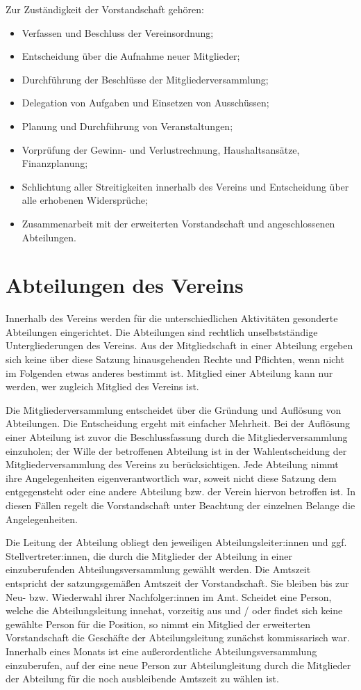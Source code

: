 \documentclass[10pt,a4paper]{article}
\begin{document}
Zur Zuständigkeit der Vorstandschaft gehören:
\begin{itemize}
\item
Verfassen und Beschluss der Vereinsordnung;
\item
Entscheidung über die Aufnahme neuer Mitglieder;
\item
Durchführung der Beschlüsse der Mitgliederversammlung;
\item
Delegation von Aufgaben und Einsetzen von Ausschüssen;
\item
Planung und Durchführung von Veranstaltungen;
\item
Vorprüfung der Gewinn- und Verlustrechnung, Haushaltsansätze, Finanzplanung;
\item
Schlichtung aller Streitigkeiten innerhalb des Vereins und Entscheidung über alle erhobenen
Widersprüche;
\item
Zusammenarbeit mit der erweiterten Vorstandschaft und angeschlossenen Abteilungen.
\end{itemize}
\section{Abteilungen des Vereins}
Innerhalb des Vereins werden für die unterschiedlichen Aktivitäten gesonderte Abteilungen eingerichtet. Die
Abteilungen sind rechtlich unselbstständige Untergliederungen des Vereins. Aus der Mitgliedschaft in einer
Abteilung ergeben sich keine über diese Satzung hinausgehenden Rechte und Pflichten, wenn nicht im
Folgenden etwas anderes bestimmt ist. Mitglied einer Abteilung kann nur werden, wer zugleich Mitglied des
Vereins ist.

Die Mitgliederversammlung entscheidet über die Gründung und Auflösung von Abteilungen. Die Entscheidung
ergeht mit einfacher Mehrheit. Bei der Auflösung einer Abteilung ist zuvor die Beschlussfassung durch die
Mitgliederversammlung einzuholen; der Wille der betroffenen Abteilung ist in der Wahlentscheidung der
Mitgliederversammlung des Vereins zu berücksichtigen.
Jede Abteilung nimmt ihre Angelegenheiten eigenverantwortlich war, soweit nicht diese Satzung dem
entgegensteht oder eine andere Abteilung bzw. der Verein hiervon betroffen ist. In diesen Fällen regelt die
Vorstandschaft unter Beachtung der einzelnen Belange die Angelegenheiten.

Die Leitung der Abteilung obliegt den jeweiligen Abteilungsleiter:innen und ggf. Stellvertreter:innen, die durch
die Mitglieder der Abteilung in einer einzuberufenden Abteilungsversammlung gewählt werden. Die Amtszeit
entspricht der satzungsgemäßen Amtszeit der Vorstandschaft. Sie bleiben bis zur Neu- bzw. Wiederwahl ihrer
Nachfolger:innen im Amt. Scheidet eine Person, welche die Abteilungsleitung innehat, vorzeitig aus und / oder
findet sich keine gewählte Person für die Position, so nimmt ein Mitglied der erweiterten Vorstandschaft die
Geschäfte der Abteilungsleitung zunächst kommissarisch war. Innerhalb eines Monats ist eine außerordentliche
Abteilungsversammlung einzuberufen, auf der eine neue Person zur Abteilungleitung durch die Mitglieder der
Abteilung für die noch ausbleibende Amtszeit zu wählen ist.
\end{document}
